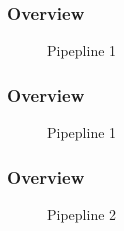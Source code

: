 \documentclass{beamer}
\begin{document}
\begin{frame} %
	\frametitle{Overview} %
		\begin{figure}[h]
		\centering
		\caption{Pipepline 1}
	\end{figure}
\end{frame}
\begin{frame} %
	\frametitle{Overview} %
	\begin{figure}[h]
		\centering
		\caption{Pipepline 1}
	\end{figure}
\end{frame}
\begin{frame} %
	\frametitle{Overview} %
	\begin{figure}[h]
		\centering
		\caption{Pipepline 2}
	\end{figure}
\end{frame}
\end{document}
